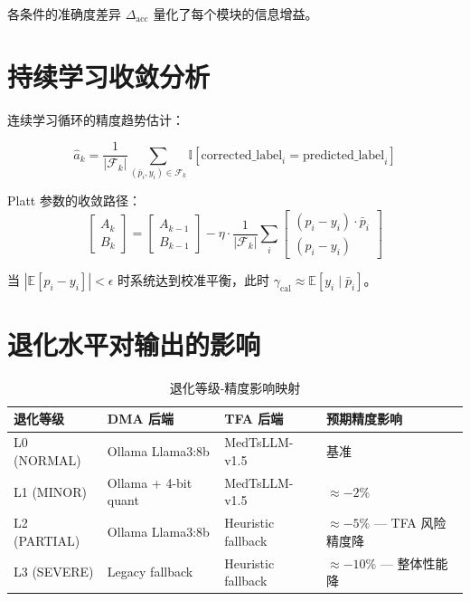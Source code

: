 \documentclass[11pt,a4paper]{ctexart}
\theoremstyle{remark}
\begin{document}
各条件的准确度差异 $\Delta_{\text{acc}}$ 量化了每个模块的信息增益。

\section{持续学习收敛分析}

连续学习循环的精度趋势估计：

\begin{equation}
\hat{a}_k = \frac{1}{|\mathcal{F}_k|}\sum_{(\bar{p}_i, y_i) \in \mathcal{F}_k} \mathbb{I}[\text{corrected\_label}_i = \text{predicted\_label}_i]
\end{equation}

Platt 参数的收敛路径：
\begin{equation}
\begin{bmatrix} A_k \\ B_k \end{bmatrix} = \begin{bmatrix} A_{k-1} \\ B_{k-1} \end{bmatrix} - \eta \cdot \frac{1}{|\mathcal{F}_k|}\sum_i \begin{bmatrix} (p_i - y_i) \cdot \bar{p}_i \\ (p_i - y_i) \end{bmatrix}
\end{equation}

当 $|\mathbb{E}[p_i - y_i]| < \epsilon$ 时系统达到校准平衡，此时 $\gamma_{\text{cal}} \approx \mathbb{E}[y_i \mid \bar{p}_i]$。

\section{退化水平对输出的影响}

\begin{table}[H]
\centering
\small
\begin{tabular}{llll}
\toprule
\textbf{退化等级} & \textbf{DMA 后端} & \textbf{TFA 后端} & \textbf{预期精度影响} \\
\midrule
L0 (NORMAL) & Ollama Llama3:8b & MedTsLLM-v1.5 & 基准 \\
L1 (MINOR) & Ollama + 4-bit quant & MedTsLLM-v1.5 & $\approx -2\%$ \\
L2 (PARTIAL) & Ollama Llama3:8b & Heuristic fallback & $\approx -5\%$ — TFA 风险精度降 \\
L3 (SEVERE) & Legacy fallback & Heuristic fallback & $\approx -10\%$ — 整体性能降 \\
\bottomrule
\end{tabular}
\caption{退化等级-精度影响映射}
\end{table}
\end{document}
